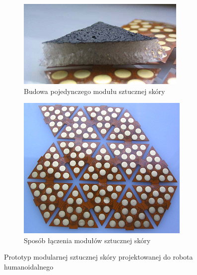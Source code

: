 \begin{figure}[!h]
  \begin{subfigure}[t]{0.55\linewidth}
    \centering
    \includegraphics[width=0.95\linewidth]{img/triangle2.png}
    \caption{Budowa pojedynczego modułu sztucznej skóry} 
  \end{subfigure}
  \begin{subfigure}[t]{0.4\linewidth}
    \centering
    \includegraphics[width=0.83\linewidth]{img/triangle3.png}
    \caption{Sposób łączenia modułów sztucznej skóry} 
  \end{subfigure}
  
  \centering
  \caption{Prototyp modularnej sztucznej skóry projektowanej do robota humanoidalnego \cite{b_konf_wloch_1_opis_budowy}}
  \label{f_triangle_1-2-3}
\end{figure}

